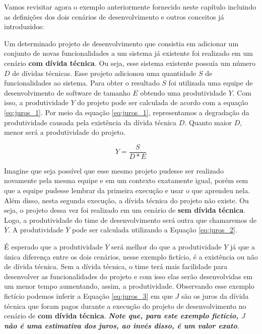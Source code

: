 Vamos revisitar agora o exemplo anteriormente fornecido neste capítulo incluindo as definições dos dois cenários de desenvolvimento e outros conceitos já introduzidos: 

\begin{tcolorbox}

Um determinado projeto de desenvolvimento que consistia em adicionar um conjunto de novas funcionalidades a um sistema já existente foi realizado em um cenário \textbf{com dívida técnica}. Ou seja, esse sistema existente possuía um número  $D$ de dívidas técnicas.  Esse projeto adicionou uma quantidade $S$ de funcionalidades ao sistema. Para obter o resultado  $S$  foi utilizada  uma equipe de desenvolvimento de software de tamanho $E$ obtendo uma produtividade $Y$.   Com isso, a produtividade $Y$ do projeto pode ser calculada de acordo com a equação \ref{eq:juros_1}. Por meio da equação \ref{eq:juros_1}, representamos a degradação da produtividade causada pela existência da dívida técnica $D$. Quanto maior $D$, menor será a produtividade do projeto.

\begin{equation}
\label{eq:juros_1}
Y =  \frac{S}{D*E}
\end{equation}

\end{tcolorbox}




Imagine que seja possível que esse mesmo projeto pudesse ser realizado novamente pela mesma equipe e em um contexto exatamente igual, porém sem que a equipe pudesse lembrar da primeira execução e usar o que aprendeu nela. Além disso, nesta segunda execução, a dívida técnica do projeto não existe. Ou seja, o projeto dessa vez foi realizado em um cenário de \textbf{sem dívida técnica}. Logo, a produtividade do time de desenvolvimento será outra que chamaremos de $\overline{Y}$. A produtividade  $\overline{Y}$ pode ser calculada utilizando a Equação \ref{eq:juros_2}. 

É esperado que  a produtividade $\overline{Y}$ será melhor do que a produtividade  $Y$ já que a única diferença entre os dois cenários, nesse exemplo fictício,  é a existência ou não de dívida técnica. Sem a dívida técnica, o time terá mais facilidade para desenvolver as funcionalidades do projeto e com isso elas serão desenvolvidas em um menor tempo aumentando, assim, a produtividade. Observando esse exemplo fictício podemos inferir a Equação \ref{eq:juros_3} em que $J$ são os juros da dívida técnica que foram pagos durante a execução do projeto de desenvolvimento no cenário de \textbf{com dívida técnica}. \textit{\textbf{Note que, para este exemplo fictício,  $J$ não  é uma estimativa dos juros, ao invés disso, é um valor exato}}.  

